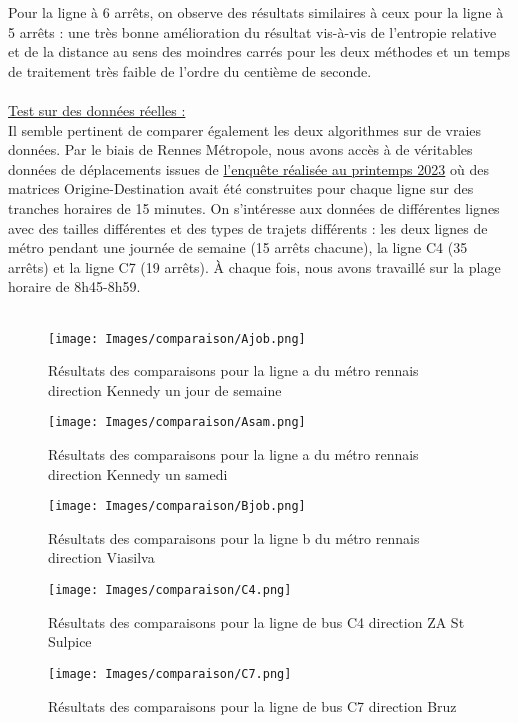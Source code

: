 \documentclass[12pt]{article}
\begin{document}
Pour la ligne à 6 arrêts, on observe des résultats similaires à ceux pour la ligne à 5 arrêts : une très bonne amélioration du résultat vis-à-vis de l'entropie relative et de la distance au sens des moindres carrés pour les deux méthodes et un temps de traitement très faible de l'ordre du centième de seconde.\\
\\
\underline{Test sur des données réelles :}\\
Il semble pertinent de comparer également les deux algorithmes sur de vraies données. Par le biais de Rennes Métropole, nous avons accès à de véritables données de déplacements issues de \href{https://metropole.rennes.fr/une-enquete-sur-les-deplacements-dans-le-reseau-star}{l'enquête réalisée au printemps 2023} où des matrices Origine-Destination avait été construites pour chaque ligne sur des tranches horaires de 15 minutes. On s'intéresse aux données de différentes lignes avec des tailles différentes et des types de trajets différents : les deux lignes de métro pendant une journée de semaine (15 arrêts chacune), la ligne C4 (35 arrêts) et la ligne C7 (19 arrêts). À chaque fois, nous avons travaillé sur la plage horaire de 8h45-8h59.\\
\\
\begin{figure}[H]
    \centering
    \texttt{[image: Images/comparaison/Ajob.png]}
    \caption{Résultats des comparaisons pour la ligne a du métro rennais direction Kennedy un jour de semaine}
\end{figure}
\begin{figure}[H]
    \centering
    \texttt{[image: Images/comparaison/Asam.png]}
    \caption{Résultats des comparaisons pour la ligne a du métro rennais direction Kennedy un samedi}
\end{figure}
\begin{figure}[H]
    \centering
    \texttt{[image: Images/comparaison/Bjob.png]}
    \caption{Résultats des comparaisons pour la ligne b du métro rennais direction Viasilva}
\end{figure}
\begin{figure}[H]
    \centering
    \texttt{[image: Images/comparaison/C4.png]}
    \caption{Résultats des comparaisons pour la ligne de bus C4 direction ZA St Sulpice}
\end{figure}
\begin{figure}[H]
    \centering
    \texttt{[image: Images/comparaison/C7.png]}
    \caption{Résultats des comparaisons pour la ligne de bus C7 direction Bruz}
\end{figure}
\end{document}
